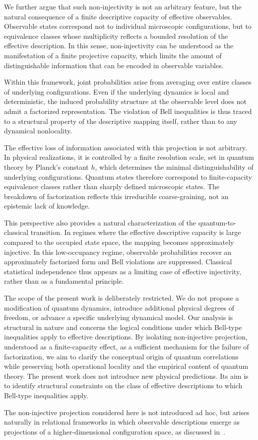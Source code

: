   We further argue that such non-injectivity is not an arbitrary feature, but the natural
  consequence of a finite descriptive capacity of effective observables.
  Observable states correspond not to individual microscopic configurations, but to
  equivalence classes whose multiplicity reflects a bounded resolution of the effective
  description.
  In this sense, non-injectivity can be understood as the manifestation of a finite
  projective capacity, which limits the amount of distinguishable information that can
  be encoded in observable variables.

  Within this framework, joint probabilities arise from averaging over entire classes of
  underlying configurations.
  Even if the underlying dynamics is local and deterministic, the induced probability
  structure at the observable level does not admit a factorized representation.
  The violation of Bell inequalities is thus traced to a structural property of the
  descriptive mapping itself, rather than to any dynamical nonlocality.

  The effective loss of information associated with this projection is not arbitrary.
  In physical realizations, it is controlled by a finite resolution scale, set in quantum
  theory by Planck's constant \(h\), which determines the minimal distinguishability of
  underlying configurations.
  Quantum states therefore correspond to finite-capacity equivalence classes rather than
  sharply defined microscopic states.
  The breakdown of factorization reflects this irreducible coarse-graining, not an
  epistemic lack of knowledge.

  This perspective also provides a natural characterization of the quantum-to-classical
  transition.
  In regimes where the effective descriptive capacity is large compared to the occupied
  state space, the mapping becomes approximately injective.
  In this low-occupancy regime, observable probabilities recover an approximately
  factorized form and Bell violations are suppressed.
  Classical statistical independence thus appears as a limiting case of effective
  injectivity, rather than as a fundamental principle.

  The scope of the present work is deliberately restricted.
  We do not propose a modification of quantum dynamics, introduce additional physical
  degrees of freedom, or advance a specific underlying dynamical model.
  Our analysis is structural in nature and concerns the logical conditions under which
  Bell-type inequalities apply to effective descriptions.
  By isolating non-injective projection, understood as a finite-capacity effect, as a
  sufficient mechanism for the failure of factorization, we aim to clarify the conceptual
  origin of quantum correlations while preserving both operational locality and the
  empirical content of quantum theory.
  The present work does not introduce new physical predictions.
  Its aim is to identify structural constraints on the class of effective
  descriptions to which Bell-type inequalities apply.

  The non-injective projection considered here is not introduced ad hoc, but arises
  naturally in relational frameworks in which observable descriptions emerge as
  projections of a higher-dimensional configuration space, as discussed
  in~\cite{Beau2026a}.
